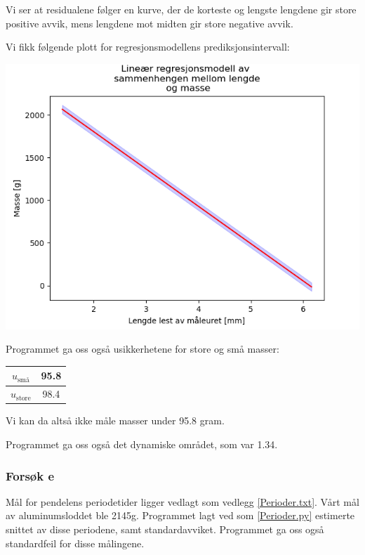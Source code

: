 Vi ser at residualene følger en kurve, der de korteste og lengste lengdene gir store positive avvik, mens lengdene mot midten gir store negative avvik.\medskip

Vi fikk følgende plott for regresjonsmodellens prediksjonsintervall:

\begin{center}
\includegraphics[scale=0.7]{Figurer/Lab_2_regresjon_prediksjon.png}
\end{center}

Programmet ga oss også usikkerhetene for store og små masser:
\begin{center}
\begin{tabular}{  | c | c |}
    \hline
    $u_{\text{små}}$ & 95.8\\
    \hline
    $u_{\text{store}}$ & 98.4\\
    \hline
\end{tabular}
\end{center}

Vi kan da altså ikke måle masser under 95.8 gram.

Programmet ga oss også det dynamiske området, som var 1.34.

\subsubsection*{Forsøk e}

Mål for pendelens periodetider ligger vedlagt som vedlegg \ref{Perioder.txt}. Vårt mål av aluminumsloddet ble 2145g. Programmet lagt ved som \ref{Perioder.py} estimerte snittet av disse periodene, samt standardavviket. Programmet ga oss også standardfeil for disse målingene.


